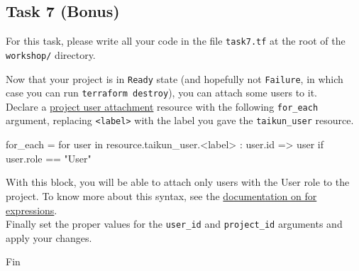 \subsection{Task 7 (Bonus)}\label{sec:task7}

\begin{note}
For this task, please write all your code in the file \texttt{task7.tf}
at the root of the \texttt{workshop/} directory.
\end{note}

Now that your project is in \texttt{Ready} state (and hopefully not \texttt{Failure},
in which case you can run \texttt{terraform destroy}), you can attach some users to it.\\

Declare a \href{https://intuinewin.github.io/taikun-docs/resources/project_user_attachment.html}{project user attachment}
resource with the following \texttt{for\_each} argument, replacing \texttt{<label>} with the label you gave
the \texttt{taikun\_user} resource.
\begin{tf}
  for_each = {
    for user in resource.taikun_user.<label> : user.id => user
    if user.role == "User"
  }
\end{tf}
With this block, you will be able to attach only users with the User role to the project.
To know more about this syntax, see the
\href{https://www.terraform.io/docs/language/expressions/for.html}{documentation on for expressions}.\\

Finally set the proper values for the \texttt{user\_id} and \texttt{project\_id} arguments
and apply your changes.

\vspace{3cm}
\begin{center}
\Huge{Fin}
\end{center}
